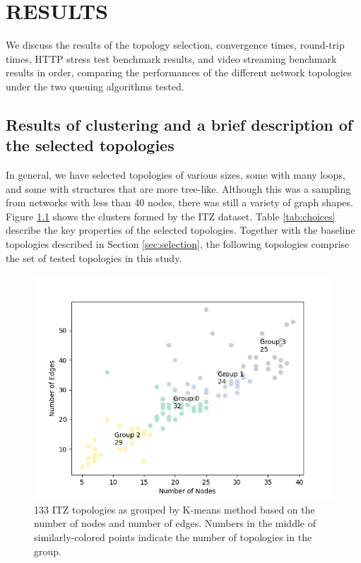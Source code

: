 \chapter{RESULTS}
We discuss the results of the topology selection, convergence times, round-trip times, HTTP stress test benchmark results, and video streaming benchmark results in order, comparing the performances of the different network topologies under the two queuing algorithms tested.

\section{Results of clustering and a brief description of the selected topologies}

In general, we have selected topologies of various sizes, some with many loops, and some with structures that are more tree-like. Although this was a sampling from networks with less than 40 nodes, there was still a variety of graph shapes. Figure \ref{fig:groups} shows the clusters formed by the ITZ dataset. Table \ref{tab:choices} describe the key properties of the selected topologies. Together with the baseline topologies described in Section \ref{sec:selection}, the following topologies comprise the set of tested topologies in this study.

\begin{figure}
\centering
\includegraphics[width=\textwidth]{Figures/clusters.png}
    \caption{133 ITZ topologies as grouped by K-means method based on the number of nodes and number of edges. Numbers in the middle of similarly-colored points indicate the number of topologies in the group.}
    \label{fig:groups}
\end{figure}

